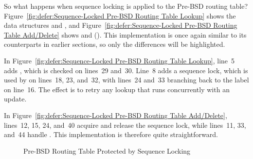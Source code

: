 So what happens when sequence locking is applied to the Pre-BSD
routing table?
Figure~\ref{fig:defer:Sequence-Locked Pre-BSD Routing Table Lookup}
shows the data structures and , and
Figure~\ref{fig:defer:Sequence-Locked Pre-BSD Routing Table Add/Delete}
shows  and  ().
This implementation is once again similar to its counterparts in earlier
sections, so only the differences will be highlighted.

In
Figure~\ref{fig:defer:Sequence-Locked Pre-BSD Routing Table Lookup},
line~5 adds , which is checked on lines~29 and~30.
Line~8 adds a sequence lock, which is used by 
on lines~18, 23, and~32, with lines~24 and~33 branching back to
the  label on line~16.
The effect is to retry any lookup that runs concurrently with an update.

In
Figure~\ref{fig:defer:Sequence-Locked Pre-BSD Routing Table Add/Delete},
lines~12, 15, 24, and~40 acquire and release the sequence lock,
while lines~11, 33, and~44 handle .
This implementation is therefore quite straightforward.

\begin{figure}[tb]
\centering
{}
\caption{Pre-BSD Routing Table Protected by Sequence Locking}
\label{fig:defer:Pre-BSD Routing Table Protected by Sequence Locking}
\end{figure}

